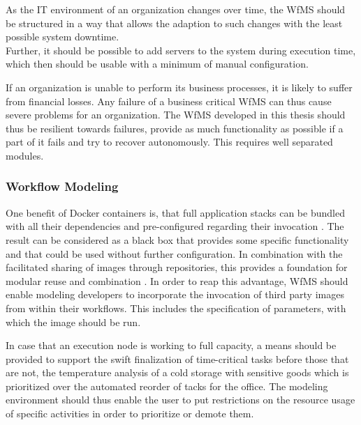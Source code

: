       As the IT environment of an organization changes over time, %
      the \ac{WfMS} should be structured in a way that allows the adaption to such changes with the least possible system downtime. \\
      Further, it should be possible to add servers to the system during execution time, which then should be usable with a minimum of manual configuration.

      If an organization is unable to perform its business processes, it is likely to suffer from financial losses. Any failure of a business critical \ac{WfMS} can thus cause severe problems for an organization. The \ac{WfMS} developed in this thesis should thus be resilient towards failures, \ie provide as much functionality as possible if a part of it fails and try to recover autonomously. This requires well separated modules.


  \subsubsection{Workflow Modeling} %
    \label{ssub:workflow_modeling}

      One benefit of Docker containers is, that full application stacks can be bundled with all their dependencies and pre-configured regarding their invocation \cite[p.~82]{Bernstein2014Containers}. The result can be considered as a black box that provides some specific functionality and that could be used without further configuration. In combination with the facilitated sharing of images through repositories, this provides a foundation for modular reuse and combination \cite[p.~6]{Boettiger2015Introduction}.
      In order to reap this advantage, \ac{WfMS} should enable modeling developers to incorporate the invocation of third party images from within their workflows. This includes the specification of parameters, with which the image should be run.

      In case that an execution node is working to full capacity, a means should be provided to support the swift finalization of time-critical tasks before those that are not, \eg the temperature analysis of a cold storage with sensitive goods which is prioritized over the automated reorder of tacks for the office. The modeling environment should thus enable the user to put restrictions on the resource usage of specific activities in order to prioritize or demote them.

